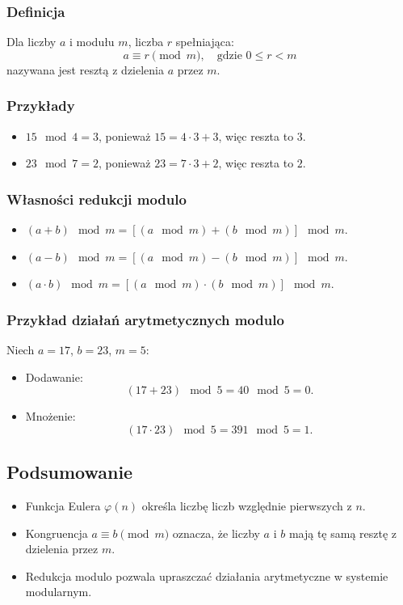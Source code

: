 \subsubsection{Definicja}
Dla liczby \( a \) i modułu \( m \), liczba \( r \) spełniająca:
\[
a \equiv r \pmod{m}, \quad \text{gdzie } 0 \leq r < m
\]
nazywana jest resztą z dzielenia \( a \) przez \( m \).

\subsubsection{Przykłady}
\begin{itemize}
    \item \( 15 \mod 4 = 3 \), ponieważ \( 15 = 4 \cdot 3 + 3 \), więc reszta to \( 3 \).
    \item \( 23 \mod 7 = 2 \), ponieważ \( 23 = 7 \cdot 3 + 2 \), więc reszta to \( 2 \).
\end{itemize}

\subsubsection{Własności redukcji modulo}
\begin{itemize}
    \item \( (a + b) \mod m = [(a \mod m) + (b \mod m)] \mod m \).
    \item \( (a - b) \mod m = [(a \mod m) - (b \mod m)] \mod m \).
    \item \( (a \cdot b) \mod m = [(a \mod m) \cdot (b \mod m)] \mod m \).
\end{itemize}

\subsubsection{Przykład działań arytmetycznych modulo}
Niech \( a = 17 \), \( b = 23 \), \( m = 5 \):

\begin{itemize}
    \item Dodawanie: \[
    (17 + 23) \mod 5 = 40 \mod 5 = 0.
    \]
    \item Mnożenie: \[
    (17 \cdot 23) \mod 5 = 391 \mod 5 = 1.
    \]
\end{itemize}

\subsection{Podsumowanie}
\begin{itemize}
    \item Funkcja Eulera \(\varphi(n)\) określa liczbę liczb względnie pierwszych z \( n \).
    \item Kongruencja \( a \equiv b \pmod{m} \) oznacza, że liczby \( a \) i \( b \) mają tę samą resztę z dzielenia przez \( m \).
    \item Redukcja modulo pozwala upraszczać działania arytmetyczne w systemie modularnym.
\end{itemize}